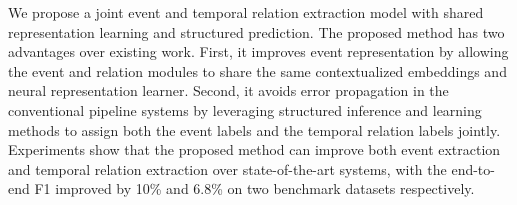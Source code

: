 We propose a joint event and temporal relation extraction model with shared representation learning and structured prediction. The proposed method has two advantages over existing work. First, it improves event representation by allowing the event and relation modules to share the same contextualized embeddings and neural representation learner. Second, it avoids error propagation in the conventional pipeline systems by leveraging structured inference and learning methods to assign both the event labels and the temporal relation labels jointly. Experiments show that the proposed method can improve both event extraction and temporal relation extraction over state-of-the-art systems, with the end-to-end F1 improved by 10\% and 6.8\% on two benchmark datasets respectively.